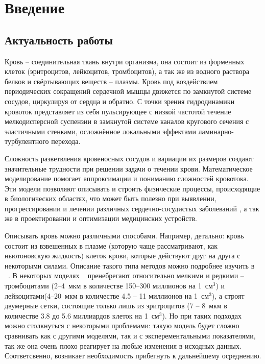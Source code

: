 \section{Введение}
\subsection{Актуальность работы}

Кровь -- соединительная ткань внутри организма, она состоит из форменных клеток (эритроцитов, лейкоцитов, тромбоцитов), а так же из
водного раствора белков и свёртывающих веществ -- плазмы. Кровь под воздействием периодических сокращений сердечной мышцы 
движется по замкнутой системе сосудов, циркулируя от сердца и обратно. С точки зрения гидродинамики кровоток представляет 
из себя пульсирующее с низкой частотой течение мелкодисперсной суспензии в 
замкнутой системе каналов кругового сечения с эластичными стенками, осложнённое локальными эффектами ламинарно-турбулентного перехода.

Сложность разветвления кровеносных сосудов и вариации их размеров создают значительные трудности при решении задачи о течении крови. 
Математическое моделирование помогает  
аппроксимации и пониманию сложностей кровотока. Эти модели позволяют описывать и строить физические процессы, происходящие 
в биологических областях, что может быть полезно при выявлении, прогрессировании и лечении  различных сердечно-сосудистых заболеваний , 
а так же в проектировании и оптимизации медицинских устройств.

Описывать кровь можно различными способами. Например, детально: кровь состоит из взвешенных в плазме 
(которую чаще рассматривают, как ньютоновскую жидкость) клеток крови, которые действуют друг на друга с некоторыми силами. 
Описание такого типа методов можно подробнее изучить в ~\cite{Fedosov:2010,Fedosov:2008,Mehboudi:2001}. 
В некоторых моделях ~\cite{bessonov:2014,hosseini:2009} пренебрегают относительно мелкими и редкими -- тромбоцитами
(2--4~мкм в количестве 150--300 миллионов на 1~см$^3$) и лейкоцитами(4--20~мкм в количестве 4.5 -- 11 миллионов на 1~см$^3$), 
а строят двумерные сетки, состоящие только лишь из эритроцитов (7 -- 8~мкм в количестве 3.8 до 5.6 миллиардов клеток на 1~см$^3$).
Но при таких подходах можно столкнуться с некоторыми проблемами: такую модель будет сложно сравнивать как
с другими моделями, так и с эксперементальными показателями, так же она очень плохо реагирует на любые изменения в исходных данных. 
Соответсвенно, возникает необходимость прибегнуть к дальнейшему осреднению.

